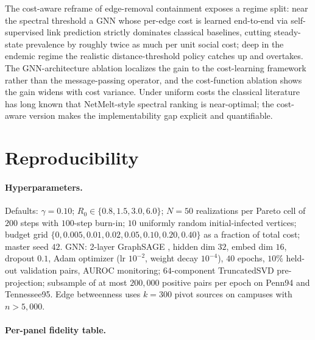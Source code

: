 \documentclass{article}
\begin{document}
The cost-aware reframe of edge-removal containment exposes a regime
split: near the spectral threshold a GNN whose per-edge cost is
learned end-to-end via self-supervised link prediction strictly
dominates classical baselines, cutting steady-state prevalence by
roughly twice as much per unit social cost; deep in the endemic
regime the realistic distance-threshold policy catches up and
overtakes. The GNN-architecture ablation localizes the gain to the
cost-learning framework rather than the message-passing operator,
and the cost-function ablation shows the gain widens with cost
variance. Under uniform costs the classical literature has long
known that NetMelt-style spectral ranking is near-optimal; the
cost-aware version makes the implementability gap explicit and
quantifiable.




\newpage
\appendix
\onecolumn

\section{Reproducibility}
\label{app:repro}

\paragraph{Hyperparameters.} Defaults: $\gamma = 0.10$;
$R_0 \in \{0.8, 1.5, 3.0, 6.0\}$; $N = 50$ realizations per Pareto
cell of $200$ steps with $100$-step burn-in; $10$ uniformly random
initial-infected vertices; budget grid
$\{0, 0.005, 0.01, 0.02, 0.05, 0.10, 0.20, 0.40\}$ as a fraction of
total cost; master seed $42$. GNN: 2-layer GraphSAGE
\citep{hamilton2017graphsage}, hidden dim $32$, embed dim $16$,
dropout $0.1$, Adam optimizer (lr $10^{-2}$, weight decay
$10^{-4}$), $40$ epochs, $10\%$ held-out validation pairs, AUROC
monitoring; $64$-component TruncatedSVD pre-projection; subsample of
at most $200{,}000$ positive pairs per epoch on Penn94 and
Tennessee95. Edge betweenness uses $k = 300$ pivot sources on
campuses with $n > 5{,}000$.

\paragraph{Per-panel fidelity table.}
\end{document}
